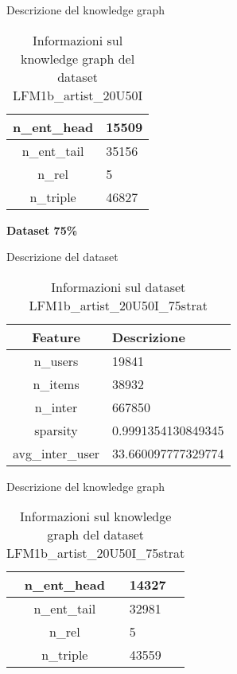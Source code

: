 \noindent Descrizione del knowledge graph
\begin{table}[H]
    \centering
    \footnotesize
    \begin{tabularx}{\textwidth}{|c|X|}
        \hline
        n\_ent\_head & 15509 \\
        \hline
        n\_ent\_tail & 35156 \\
        \hline
        n\_rel & 5 \\
        \hline
        n\_triple & 46827 \\
        \hline
    \end{tabularx}
    \caption{Informazioni sul knowledge graph del dataset LFM1b\_artist\_20U50I}
    \label{tab:dataset_info}
\end{table}

\noindent\textbf{Dataset 75\%}

\noindent Descrizione del dataset
\begin{table}[H]
    \centering
    \footnotesize
    \begin{tabularx}{\textwidth}{|c|X|}
        \hline
        \textbf{Feature} & \textbf{Descrizione} \\
        \hline
        n\_users & 19841 \\
        \hline
        n\_items & 38932 \\
        \hline
        n\_inter & 667850 \\
        \hline
        sparsity & 0.9991354130849345 \\
        \hline
        avg\_inter\_user & 33.660097777329774 \\
        \hline
    \end{tabularx}
    \caption{Informazioni sul dataset LFM1b\_artist\_20U50I\_75strat}
    \label{tab:dataset_info}
\end{table}


\noindent Descrizione del knowledge graph
\begin{table}[H]
    \centering
    \footnotesize
    \begin{tabularx}{\textwidth}{|c|X|}
        \hline
        n\_ent\_head & 14327 \\
        \hline
        n\_ent\_tail & 32981 \\
        \hline
        n\_rel & 5 \\
        \hline
        n\_triple & 43559 \\
        \hline
    \end{tabularx}
    \caption{Informazioni sul knowledge graph del dataset LFM1b\_artist\_20U50I\_75strat}
    \label{tab:dataset_info}
\end{table}

